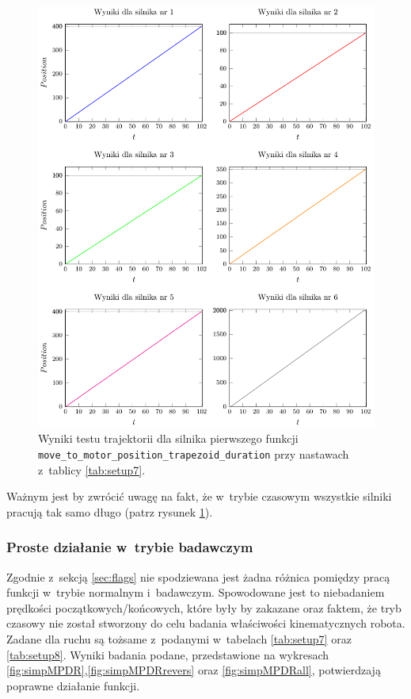\documentclass[a4paper, 12pt]{article}
\begin{document}
	\begin{figure}[H]
		\centering
		\includegraphics[scale=1.1]{raport_graphs/simpMPDall.pdf}
		\caption{Wyniki testu trajektorii dla silnika pierwszego funkcji \texttt{move\_to\_motor\_position\_trapezoid\_duration} przy nastawach z~tablicy \ref{tab:setup7}.}
		\label{fig:simpMPDall}
	\end{figure}	
	
	Ważnym jest by zwrócić uwagę na fakt, że w~trybie czasowym wszystkie silniki pracują tak samo długo (patrz rysunek \ref{fig:simpMPDall}).
	
	\subsubsection{Proste działanie w~trybie badawczym}
	Zgodnie z~sekcją \ref{sec:flags} nie spodziewana jest żadna różnica pomiędzy pracą funkcji w~trybie normalnym i~badawczym. Spowodowane jest to niebadaniem prędkości początkowych/końcowych, które były by zakazane oraz faktem, że tryb czasowy nie został stworzony do celu badania właściwości kinematycznych robota. 
	Zadane dla ruchu są tożsame z~podanymi w~tabelach \ref{tab:setup7} oraz \ref{tab:setup8}. Wyniki badania podane, przedstawione na wykresach \ref{fig:simpMPDR},\ref{fig:simpMPDRrevers} oraz \ref{fig:simpMPDRall}, potwierdzają poprawne działanie funkcji.
	
\end{document}
